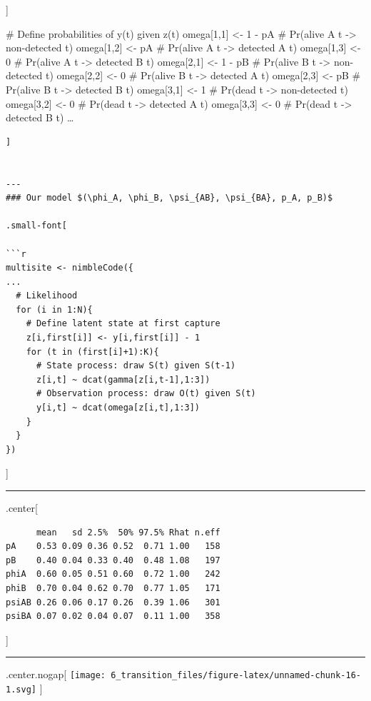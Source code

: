 \documentclass[
]{article}
\begin{document}
{]}

\# Define probabilities of y(t) given z(t) omega{[}1,1{]} \textless- 1 -
pA \# Pr(alive A t -\textgreater{} non-detected t) omega{[}1,2{]}
\textless- pA \# Pr(alive A t -\textgreater{} detected A t)
omega{[}1,3{]} \textless- 0 \# Pr(alive A t -\textgreater{} detected B
t) omega{[}2,1{]} \textless- 1 - pB \# Pr(alive B t -\textgreater{}
non-detected t) omega{[}2,2{]} \textless- 0 \# Pr(alive B t
-\textgreater{} detected A t) omega{[}2,3{]} \textless- pB \# Pr(alive B
t -\textgreater{} detected B t) omega{[}3,1{]} \textless- 1 \# Pr(dead t
-\textgreater{} non-detected t) omega{[}3,2{]} \textless- 0 \# Pr(dead t
-\textgreater{} detected A t) omega{[}3,3{]} \textless- 0 \# Pr(dead t
-\textgreater{} detected B t) \ldots{}

\begin{verbatim}
]


---
### Our model $(\phi_A, \phi_B, \psi_{AB}, \psi_{BA}, p_A, p_B)$

.small-font[

```r
multisite <- nimbleCode({
...
  # Likelihood 
  for (i in 1:N){
    # Define latent state at first capture
    z[i,first[i]] <- y[i,first[i]] - 1
    for (t in (first[i]+1):K){
      # State process: draw S(t) given S(t-1)
      z[i,t] ~ dcat(gamma[z[i,t-1],1:3])
      # Observation process: draw O(t) given S(t)
      y[i,t] ~ dcat(omega[z[i,t],1:3])
    }
  }
})
\end{verbatim}

{]}

\begin{center}\rule{0.5\linewidth}{0.5pt}\end{center}

.center{[}

\begin{verbatim}
      mean   sd 2.5%  50% 97.5% Rhat n.eff
pA    0.53 0.09 0.36 0.52  0.71 1.00   158
pB    0.40 0.04 0.33 0.40  0.48 1.08   197
phiA  0.60 0.05 0.51 0.60  0.72 1.00   242
phiB  0.70 0.04 0.62 0.70  0.77 1.05   171
psiAB 0.26 0.06 0.17 0.26  0.39 1.06   301
psiBA 0.07 0.02 0.04 0.07  0.11 1.00   358
\end{verbatim}

{]}

\begin{center}\rule{0.5\linewidth}{0.5pt}\end{center}

.center.nogap{[}
\texttt{[image: 6\_transition\_files/figure-latex/unnamed-chunk-16-1.svg]}
{]}
\end{document}
